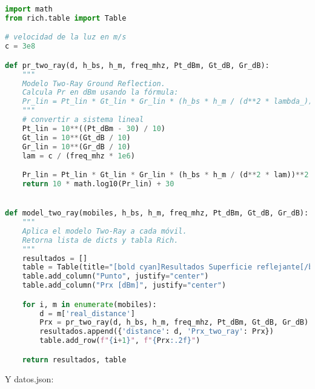 \begin{lstlisting}[language=Python, caption={superficie\_reflejante.py}]
import math
from rich.table import Table

# velocidad de la luz en m/s
c = 3e8

def pr_two_ray(d, h_bs, h_m, freq_mhz, Pt_dBm, Gt_dB, Gr_dB):
    """
    Modelo Two-Ray Ground Reflection.
    Calcula Pr en dBm usando la fórmula:
    Pr_lin = Pt_lin * Gt_lin * Gr_lin * (h_bs * h_m / (d**2 * lambda_))**2
    """
    # convertir a sistema lineal
    Pt_lin = 10**((Pt_dBm - 30) / 10)
    Gt_lin = 10**(Gt_dB / 10)
    Gr_lin = 10**(Gr_dB / 10)
    lam = c / (freq_mhz * 1e6)

    Pr_lin = Pt_lin * Gt_lin * Gr_lin * (h_bs * h_m / (d**2 * lam))**2
    return 10 * math.log10(Pr_lin) + 30


def model_two_ray(mobiles, h_bs, h_m, freq_mhz, Pt_dBm, Gt_dB, Gr_dB):
    """
    Aplica el modelo Two-Ray a cada móvil.
    Retorna lista de dicts y tabla Rich.
    """
    resultados = []
    table = Table(title="[bold cyan]Resultados Superficie reflejante[/bold cyan]")
    table.add_column("Punto", justify="center")
    table.add_column("Prx [dBm]", justify="center")

    for i, m in enumerate(mobiles):
        d = m['real_distance']
        Prx = pr_two_ray(d, h_bs, h_m, freq_mhz, Pt_dBm, Gt_dB, Gr_dB)
        resultados.append({'distance': d, 'Prx_two_ray': Prx})
        table.add_row(f"{i+1}", f"{Prx:.2f}")

    return resultados, table
\end{lstlisting}

Y datos.json:
